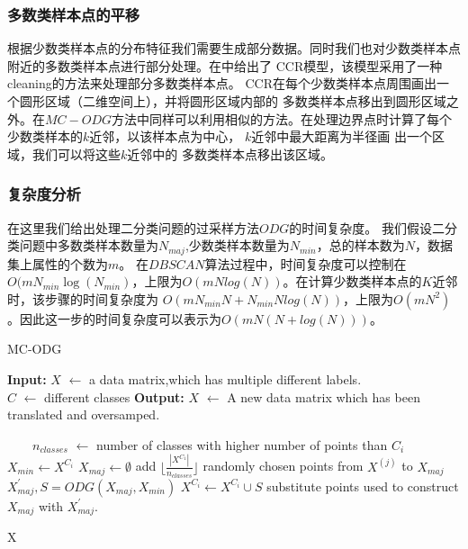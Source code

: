 \documentclass{article}
\begin{document}
\subsubsection{多数类样本点的平移}
根据少数类样本点的分布特征我们需要生成部分数据。同时我们也对少数类样本点附近的多数类样本点进行部分处理。在\cite{2017CCR}中给出了
CCR模型，该模型采用了一种cleaning的方法来处理部分多数类样本点。
CCR在每个少数类样本点周围画出一个圆形区域（二维空间上），并将圆形区域内部的
多数类样本点移出到圆形区域之外。在$MC-ODG$方法中同样可以利用相似的方法。在处理边界点时计算了每个少数类样本的$k$近邻，以该样本点为中心，
$k$近邻中最大距离为半径画
出一个区域，我们可以将这些$k$近邻中的
多数类样本点移出该区域。

\subsubsection{复杂度分析}
在这里我们给出处理二分类问题的过采样方法$ODG$的时间复杂度。
我们假设二分类问题中多数类样本数量为$N_{maj}$,少数类样本数量为$N_{min}$，总的样本数为$N$，数据集上属性的个数为$m$。
在$DBSCAN$算法过程中，时间复杂度可以控制在$O(mN_{min}\log(N_{min})$，上限为$O(mNlog(N))$。在计算少数类样本点的$K$近邻时，该步骤的时间复杂度为
$O(mN_{min}N+N_{min}Nlog(N))$，上限为$O(mN^2)$。因此这一步的时间复杂度可以表示为$O(mN(N+log(N)))$。

\begin{algorithm}[t]
  \caption{MC-ODG} %
  \label{alg2}
  \hspace*{0.02in} {\bf Input:} %
   $X$ $\leftarrow$ a data matrix,which has multiple different labels.  \\
   $C$ $\leftarrow$ different classes
  \hspace*{0.02in} {\bf Output:} %
   $X$ $\leftarrow$ A new data matrix which has been translated and oversamped.
  \begin{algorithmic}[1]
   
  　　\State $n_{classes}$ $\leftarrow$ number of classes with higher number of points than $C_i$ 
        \State $X_{min} \leftarrow X^{C_i}$ 
        \State $X_{maj} \leftarrow \emptyset$
            \State add $\lfloor \frac{|X^{C_1}|}{n_{classes}} \rfloor$ randomly chosen points from $X^{(j)}$ to $X_{maj}$
        \EndFor
        \State $X_{maj}^{'},S=ODG(X_{maj},X_{min})$
        \State $X^{C_i} \leftarrow X^{C_i} \cup S$
        \State substitute points used to construct $X_{maj}$ with $X_{maj}^{'}$. 
      \EndIf
  \EndFor
  
  \State \Return X
  \end{algorithmic}
  \end{algorithm}
\end{document}
